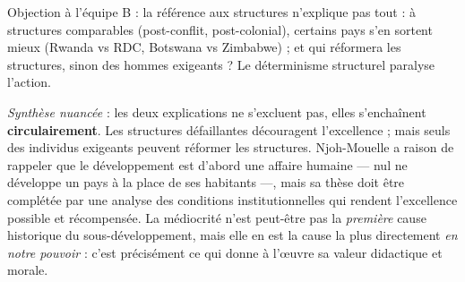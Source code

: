 \documentclass[11pt]{article}
\begin{document}
\begin{exoresolu}
Objection à l'équipe B : la référence aux structures n'explique pas tout : à structures comparables (post-conflit, post-colonial), certains pays s'en sortent mieux (Rwanda vs RDC, Botswana vs Zimbabwe) ; et qui réformera les structures, sinon des hommes exigeants ? Le déterminisme structurel paralyse l'action.

\emph{Synthèse nuancée} : les deux explications ne s'excluent pas, elles s'enchaînent \textbf{circulairement}. Les structures défaillantes découragent l'excellence ; mais seuls des individus exigeants peuvent réformer les structures. Njoh-Mouelle a raison de rappeler que le développement est d'abord une affaire humaine — nul ne développe un pays à la place de ses habitants —, mais sa thèse doit être complétée par une analyse des conditions institutionnelles qui rendent l'excellence possible et récompensée. La médiocrité n'est peut-être pas la \emph{première} cause historique du sous-développement, mais elle en est la cause la plus directement \emph{en notre pouvoir} : c'est précisément ce qui donne à l'œuvre sa valeur didactique et morale.


\end{exoresolu}
\end{document}
